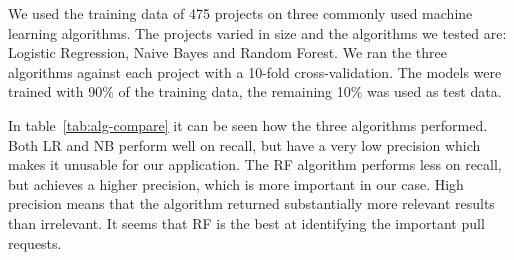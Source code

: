 \documentclass[conference]{IEEEtran}
\begin{document}
We used the training data of 475 projects on three commonly used machine learning algorithms.
The projects varied in size and the algorithms we tested are: Logistic Regression, Naive Bayes and Random Forest.
We ran the three algorithms against each project with a 10-fold cross-validation.
The models were trained with 90\% of the training data, the remaining 10\% was used as test data.

In table~\ref{tab:alg-compare} it can be seen how the three algorithms performed.
Both LR and NB perform well on recall, but have a very low precision which makes it unusable for our application.
The RF algorithm performs less on recall, but achieves a higher precision, which is more important in our case.
High precision means that the algorithm returned substantially more relevant results than irrelevant.
It seems that RF is the best at identifying the important pull requests.
\end{document}
